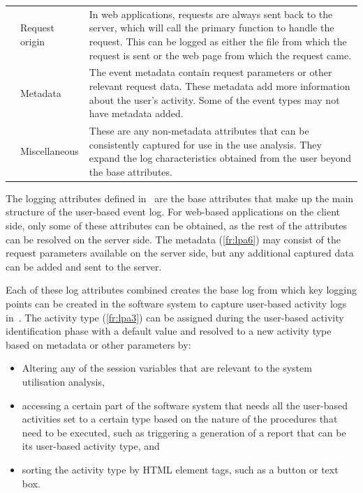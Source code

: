 \begin{xltabular}{\textwidth}{llX}
     & Request origin & In web applications, requests are always sent back to the server, which will call the primary function to handle the request. This can be logged as either the file from which the request is sent or the web page from which the request came. \\ 

	 & Metadata & The event metadata contain request parameters or other relevant request data. These metadata add more information about the user's activity. Some of the event types may not have metadata added. \\

     & Miscellaneous & These are any non-metadata attributes that can be consistently captured for use in the use analysis. They expand the log characteristics obtained from the user beyond the base attributes. \\ 
    \bottomrule
\end{xltabular}

The logging attributes defined in~ are the base attributes that make up the main structure of the user-based event log. For web-based applications on the client side, only some of these attributes can be obtained, as the rest of the attributes can be resolved on the server side. The metadata (\ref{fr:lpa6}) may consist of the request parameters available on the server side, but any additional captured data can be added and sent to the server. \par Each of these log attributes combined creates the base log from which key logging points can be created in the software system to capture user-based activity logs in~. The activity type (\ref{fr:lpa3}) can be assigned during the user-based activity identification phase with a default value and resolved to a new activity type based on metadata or other parameters by:

\begin{itemize}
	\item Altering any of the session variables that are relevant to the system utilisation analysis,
	\item accessing a certain part of the software system that needs all the user-based activities set to a certain type based on the nature of the procedures that need to be executed, such as triggering a generation of a report that can be its user-based activity type, and
	\item sorting the activity type by HTML element tags, such as a button or text box.
\end{itemize}

